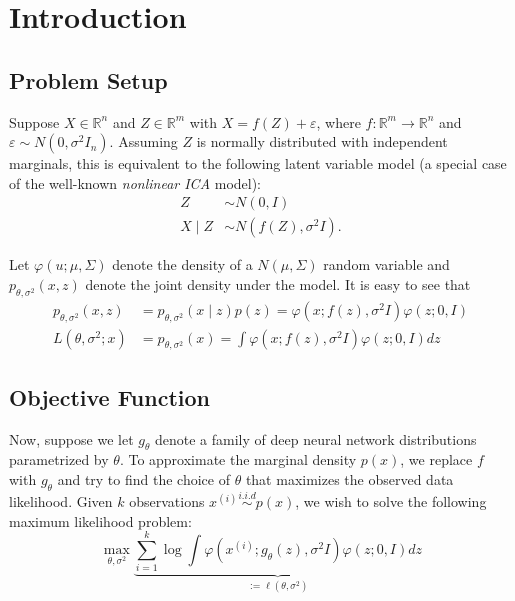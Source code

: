 \section{Introduction}
\subsection{Problem Setup}
Suppose $X \in \mathbb{R}^{n}$ and $Z \in \mathbb{R}^{m}$ with $X=f(Z)+\varepsilon$, where $f: \mathbb{R}^{m} \rightarrow \mathbb{R}^{n}$ and $\varepsilon \sim N\left(0, \sigma^{2} I_{n}\right)$. Assuming $Z$ is normally distributed with independent marginals, this is equivalent to the following latent variable model (a special case of the well-known \textit{nonlinear ICA} model):
\begin{equation*}
\begin{aligned}
Z & \sim N\left(0, I\right) \\
X \mid Z & \sim N\left(f(Z), \sigma^{2} I\right) .
\end{aligned}
\end{equation*}

Let $\varphi(u ; \mu, \Sigma)$ denote the density of a $N(\mu, \Sigma)$ random variable and $p_{\theta, \sigma^{2}}(x, z)$ denote the joint density under the model. It is easy to see that
\begin{equation*}
\begin{aligned}
p_{\theta, \sigma^{2}}\left(x, z\right) &=p_{\theta, \sigma^{2}} \left(x \mid z\right) p(z)=\varphi\left(x ; f(z), \sigma^{2} I\right) \varphi(z ; 0, I) \\
L \left(\theta, \sigma^{2} ; x\right) &= p_{\theta, \sigma^{2}}\left(x\right) =\int \varphi\left(x ; f(z), \sigma^{2} I\right) \varphi(z ; 0, I) dz
\end{aligned}
\end{equation*}

\subsection{Objective Function}
Now, suppose we let $g_{\theta}$ denote a family of deep neural network distributions parametrized by $\theta$. To approximate the marginal density $p(x)$, we replace $f$ with $g_{\theta}$ and try to find the choice of $\theta$ that maximizes the observed data likelihood. Given $k$ observations $x^{(i)} \stackrel{i.i.d}{\sim} p(x)$, we wish to solve the following maximum likelihood problem:
\begin{equation*}
\max_{\theta, \sigma^{2}} \underbrace{\sum_{i=1}^{k} \log \int \varphi\left(x^{(i)} ; g_{\theta}(z), \sigma^{2} I\right) \varphi(z ; 0, I) dz}_{:=\ell(\theta, \sigma^{2})}
\end{equation*}

